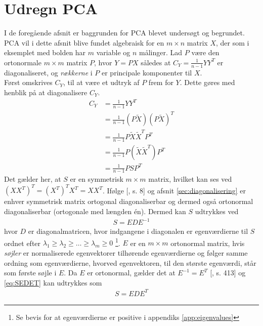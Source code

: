 \section{Udregn PCA} \label{sec:UdregnPCA}
I de foregående afsnit er baggrunden for PCA blevet undersøgt og begrundet. PCA vil i dette afsnit blive fundet algebraisk for en $m\times n$ matrix $X$, der som i eksemplet med bolden har $m$ variable og $n$ målinger. Lad $P$ være den ortonormale $m \times m$ matrix $P$, hvor $Y=PX$ således at $C_Y=\frac{1}{n-1}YY^T$ er diagonaliseret, og \emph{rækkerne} i $P$ er principale komponenter til $X$. \\
Først omskrives $C_Y$, til at være et udtryk af $P$ frem for $Y$. Dette gøres med henblik på at diagonalisere $C_Y$.
\begin{align}
C_Y 	& = \frac{1}{n-1} YY^T						\\
	& = \frac{1}{n-1} (P\tilde{X})(P\tilde{X})^T		\nonumber	\\
	& = \frac{1}{n-1} P\tilde{X}\tilde{X}^TP^T		\nonumber	\\
	& = \frac{1}{n-1} P(\tilde{X}\tilde{X}^T)P^T		\nonumber	\\
	& = \frac{1}{n-1} PSP^T
\end{align}
Det gælder her, at $S$ er en symmetrisk $m \times m$ matrix, hvilket kan ses ved $(XX^T)^T = (X^T)^TX^T = XX^T$. Ifølge [\citet{PCA_people}, s. 8] og afsnit \ref{sec:diagonalisering} er enhver symmetrisk matrix ortogonal diagonaliserbar og dermed også ortonormal diagonaliserbar (ortogonale med længden én). Dermed kan $S$ udtrykkes ved 
\begin{align*}
S=EDE^{-1}
\end{align*}
hvor $D$ er diagonalmatricen, hvor indgangene i diagonalen er egenværdierne til $S$ ordnet efter $\lambda_1 \geq \lambda_2 \geq \ldots \geq \lambda_m \geq 0$ \footnote{Se bevis for at egenværdierne er positive i appendiks \ref{app:eigenvalues}}. $E$ er en $m \times m$ ortonormal matrix, hvis \emph{søjler} er normaliserede egenvektorer tilhørende egenværdierne og følger samme ordning som egenværdierne, hvorved egenvektoren, til den største egenværdi, står som første søjle i $E$. 
Da $E$ er ortonormal, gælder det at $E^{-1}=E^T$ [\cite{linalg}, s. 413] og \ref{eq:SEDET} kan udtrykkes som
\begin{align}
S=EDE^T
\label{eq:SEDET}
\end{align}

